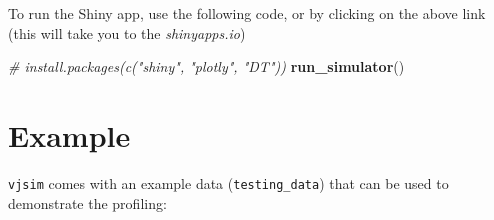 \documentclass[
]{book}
\newenvironment{Shaded}{\begin{snugshade}}{\end{snugshade}}
\newcommand{\CommentTok}[1]{\textcolor[rgb]{0.56,0.35,0.01}{\textit{#1}}}
\newcommand{\KeywordTok}[1]{\textcolor[rgb]{0.13,0.29,0.53}{\textbf{#1}}}
\newcommand{\NormalTok}[1]{#1}
\begin{document}
To run the Shiny app, use the following code, or by clicking on the above link (this will take you to the \emph{shinyapps.io})

\begin{Shaded}
\begin{Highlighting}[]
\CommentTok{\# install.packages(c("shiny", "plotly", "DT"))}
\KeywordTok{run\_simulator}\NormalTok{()}
\end{Highlighting}
\end{Shaded}

\hypertarget{example}{%
\section{Example}\label{example}}

\texttt{vjsim} comes with an example data (\texttt{testing\_data}) that can be used to demonstrate the profiling:
\end{document}
